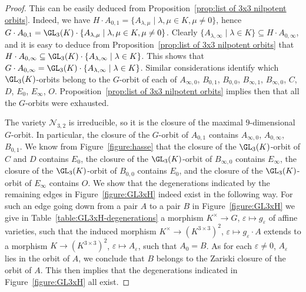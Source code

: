 \documentclass[12pt]{amsart}
\newcommand{\field}{K}
\begin{document}
\begin{proof} 
This can be easily deduced from Proposition~\ref{prop:list of 3x3 nilpotent orbits}. 
Indeed, we have $H\cdot A_{0,1}=\{A_{\lambda,\mu}\mid \lambda,\mu\in \field,\mu\neq 0\}$, 
hence $G\cdot A_{0,1}=\GL_3(\field)\cdot 
\{A_{\lambda,\mu}\mid \lambda,\mu\in \field, \mu \neq 0\}$. 
Clearly $\{A_{\lambda,\infty}\mid \lambda\in\field\}
\subseteq H\cdot A_{0,\infty}$, and it is easy to deduce from 
Proposition~\ref{prop:list of 3x3 nilpotent orbits} that 
$H\cdot A_{0,\infty}\subseteq \GL_3(\field)\cdot 
\{A_{\lambda,\infty}\mid \lambda\in\field\}$. 
This shows that 
$G\cdot A_{0,\infty}=\GL_3(\field)\cdot 
\{A_{\lambda,\infty}\mid \lambda\in \field\}$. 
Similar considerations identify which $\GL_3(\field)$-orbits belong to 
the $G$-orbit of each of $A_{\infty,0}$, 
$B_{0,1}$, $B_{0,0}$, $B_{\infty,1}$, $B_{\infty,0}$, 
$C$, $D$, $E_0$, $E_\infty$, $O$. 
Proposition~\ref{prop:list of 3x3 nilpotent orbits} implies then that 
all the $G$-orbits were exhausted. 

The variety $\mathcal{N}_{3,2}$ is irreducible, so it is the closure of 
the maximal $9$-dimensional $G$-orbit. 
In particular, the closure of the $G$-orbit of $A_{0,1}$ contains $A_{\infty,0}$, $A_{0,\infty}$, $B_{0,1}$.   
We know from Figure~\ref{figure:hasse} that the closure of the $\GL_3(\field)$-orbit of $C$ and $D$ 
contains $E_0$, 
the closure of the $\GL_3(\field)$-orbit of $B_{\infty,0}$ contains $E_\infty$, 
the closure of the $\GL_3(\field)$-orbit of $B_{0,0}$ contains $E_0$, 
and the closure of the $\GL_3(\field)$-orbit of $E_{\infty}$ contains $O$. 
We show that the degenerations indicated by the remaining edges in 
Figure~\ref{figure:GL3xH} indeed exist in the following way. For such an edge going down 
from a pair $A$ to a pair $B$ in Figure~\ref{figure:GL3xH} we give in 
Table~\ref{table:GL3xH-degenerations} 
a morphism $\field^\times \to G$, 
$\varepsilon\mapsto g_\varepsilon$ of affine varieties, such that the induced morphism 
$\field^\times \to (\field^{3\times 3})^2$, $\varepsilon\mapsto g_\varepsilon \cdot A$ 
extends to a morphism $\field\to (\field^{3\times 3})^2$, $\varepsilon\mapsto A_\varepsilon$, 
such that $A_0=B$. As for each $\varepsilon \neq 0$, 
$A_{\varepsilon}$ lies in the orbit of $A$, we conclude that $B$ belongs to the Zariski closure 
of the orbit of $A$. 
This then implies that the degenerations indicated in Figure~\ref{figure:GL3xH} all exist. 


\end{proof}
\end{document}
